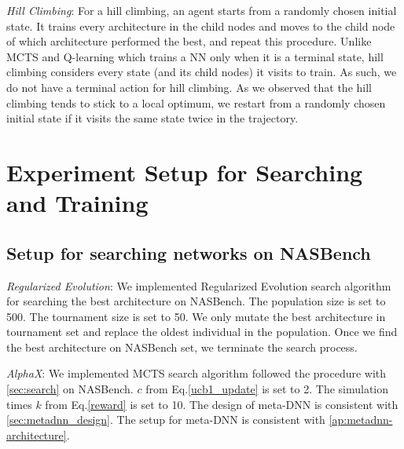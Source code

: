 \documentclass[10pt,twocolumn,letterpaper]{article}
\begin{document}
\textit{Hill Climbing}: For a hill climbing, an agent starts from a randomly chosen initial state. It trains every architecture in the child nodes and moves to the child node of which architecture performed the best, and repeat this procedure. Unlike MCTS and Q-learning which trains a NN only when it is a terminal state, hill climbing considers every state (and its child nodes) it visits to train. As such, we do not have a terminal action for hill climbing.
As we observed that the hill climbing tends to stick to a local optimum, we restart from a randomly chosen initial state if it visits the same state twice in the trajectory.

\section{Experiment Setup for Searching and Training}
\label{ap:experiment_setup}

\subsection{Setup for searching networks on NASBench}

\textit{Regularized Evolution}: We implemented Regularized Evolution\cite{real2018regularized} search algorithm for searching the best architecture on NASBench. The population size is set to 500. The tournament size is set to 50. We only mutate the best architecture in tournament set and replace the oldest individual in the population. Once we find the best architecture on NASBench set, we terminate the search process.

\textit{AlphaX}: We implemented MCTS search algorithm followed the procedure with \ref{sec:search} on NASBench. $c$ from Eq.\ref{ucb1_update} is set to 2. The simulation times $k$ from Eq.\ref{reward}  is set to 10. The design of meta-DNN is consistent with \ref{sec:metadnn_design}. The setup for meta-DNN is consistent with \ref{ap:metadnn-architecture}. 
\end{document}
